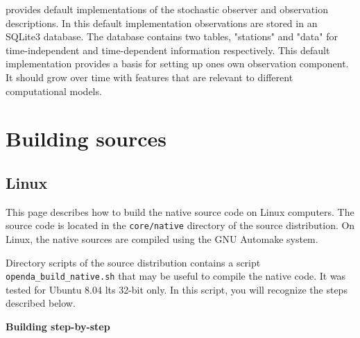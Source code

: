 \oda provides default implementations of the stochastic observer and observation descriptions. In this default implementation observations are stored in an SQLite3 database. The database contains two tables, "stations" and "data" for time-independent and time-dependent information respectively. This default implementation provides a basis for setting up ones own observation component. It should grow over time with features that are relevant to different computational models. 

\section{Building sources}

\subsection{Linux}

This page describes how to build the \oda native source code on Linux computers. The source code is located in the \verb|core/native| directory of the source distribution. On Linux, the native sources are compiled using the GNU Automake system.

Directory scripts of the source distribution contains a script \verb|openda_build_native.sh| that may be useful to compile the native code. It was tested for Ubuntu 8.04 lts 32-bit only. In this script, you will recognize the steps described below.

\textbf{Building step-by-step}

